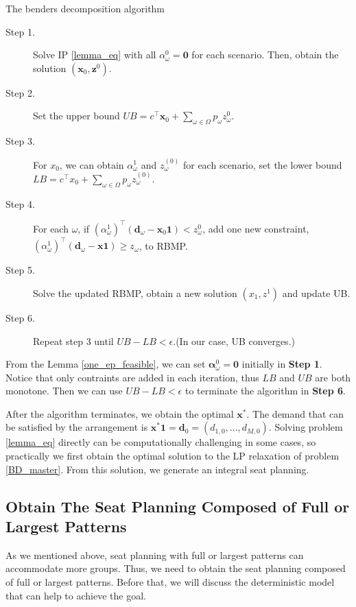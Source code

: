 \begin{algorithm}[H]\label{cut_algo}
  \caption{The benders decomposition algorithm}
    \begin{description}
    \item[Step 1.] Solve IP \eqref{lemma_eq} with all $\alpha_{\omega}^0 = \mathbf{0}$ for each scenario. Then, obtain the solution $(\mathbf{x}_0, \mathbf{z}^{0})$.
    \item[Step 2.] Set the upper bound $UB = c^{\intercal} \mathbf{x}_0 + \sum_{\omega \in \Omega} p_{\omega} z_{\omega}^{0}$.
    \item[Step 3.] For $x_0$, we can obtain $\alpha_{\omega}^{1}$ and $z_{\omega}^{(0)}$ for each scenario, set the lower bound $LB = c^{\intercal} x_0 + \sum_{\omega \in \Omega} p_{\omega} z_{\omega}^{(0)}$.
    \item[Step 4.] For each $\omega$, if $(\alpha_{\omega}^{1})^{\intercal}(\mathbf{d}_{\omega}- \mathbf{x}_0 \mathbf{1}) < z_{\omega}^{0}$, add one new constraint, $(\alpha_{\omega}^{1})^{\intercal}(\mathbf{d}_{\omega}- \mathbf{x} \mathbf{1}) \geq z_{\omega}$, to RBMP.
    \item[Step 5.] Solve the updated RBMP, obtain a new solution $(x_1, z^{1})$ and update UB.
    \item[Step 6.] Repeat step 3 until $UB - LB < \epsilon$.(In our case, UB converges.)
   \end{description}
  \end{algorithm}

From the Lemma \ref{one_ep_feasible}, we can set $\bm{\alpha}_{\omega}^0 = \mathbf{0}$ initially in {\bf Step 1}. Notice that only contraints are added in each iteration, thus $LB$ and $UB$ are both monotone. Then we can use $UB - LB < \epsilon$ to terminate the algorithm in {\bf Step 6}.


After the algorithm terminates, we obtain the optimal $\mathbf{x}^{*}$. The demand that can be satisfied by the arrangement is $\mathbf{x}^{*} \mathbf{1} = \mathbf{d}_0 = (d_{1,0},\ldots,d_{M,0})$. Solving problem \eqref{lemma_eq} directly can be computationally challenging in some cases, so practically we first obtain the optimal solution to the LP relaxation of problem \eqref{BD_master}. From this solution, we generate an integral seat planning.

\subsection{Obtain The Seat Planning Composed of Full or Largest Patterns}\label{seat_assignment}
As we mentioned above, seat planning with full or largest patterns can accommodate more groups. Thus, we need to obtain the seat planning composed of full or largest patterns. Before that, we will discuss the deterministic model that can help to achieve the goal.

